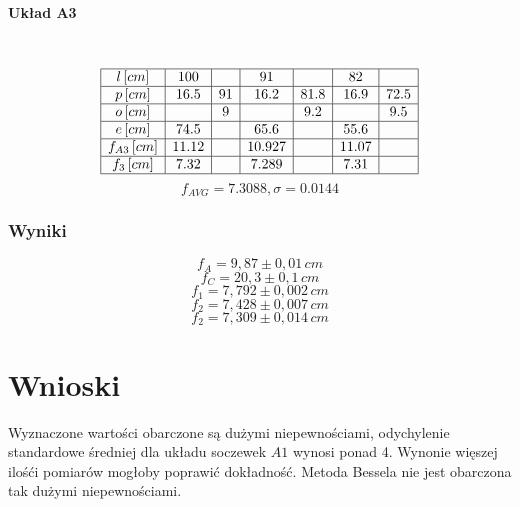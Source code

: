 \documentclass[a4paper, 11pt]{article}
\begin{document}
\paragraph{Układ A3}\label{par:paragraph_name} %
\mbox{} \\
\[
	\begin{array}{|c|c|c|c|c|c|c|c|c|}
		\hline
		l \, [cm]      & 100   & ~  & 91     & ~    & 82    & ~    \\ \hline
		p \, [cm]      & 16.5  & 91 & 16.2   & 81.8 & 16.9  & 72.5 \\ \hline
		o \, [cm]      & ~     & 9  & ~      & 9.2  & ~     & 9.5  \\ \hline
		e \, [cm]      & 74.5  & ~  & 65.6   & ~    & 55.6  & ~    \\ \hline
		f_{A3} \, [cm] & 11.12 & ~  & 10.927 & ~    & 11.07 & ~    \\ \hline
		f_3 \, [cm]    & 7.32  & ~  & 7.289  & ~    & 7.31  & ~    \\ \hline
	\end{array}
\]
$$f_{AVG} = 7.3088 , \sigma = 0.0144 $$



\subsubsection{Wyniki}\label{sec:wyniki} %
\Large
\[
	f_A = 9,87 \pm 0,01 \, cm
\]
\[
	f_C = 20,3 \pm 0,1  \, cm
\]
\[
	f_1 = 7,792 \pm 0,002  \, cm
\]
\[
	f_2 = 7,428 \pm 0,007  \, cm
\]
\[
	f_2 = 7,309 \pm 0,014  \, cm
\]
\normalsize




\section{Wnioski}\label{sec:wnioski} %
Wyznaczone wartości obarczone są dużymi niepewnościami, odychylenie standardowe średniej dla układu soczewek $A1$ wynosi ponad 4. Wynonie więszej ilośći pomiarów mogłoby poprawić dokładność. Metoda Bessela nie jest obarczona tak dużymi niepewnościami.
\end{document}
